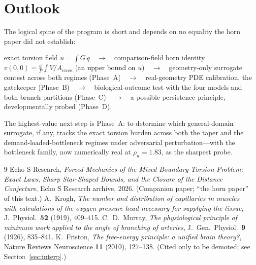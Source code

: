 \documentclass[11pt]{article}
\theoremstyle{remark}
\newcommand{\Acr}{A_{\mathrm{cross}}}
\newcommand{\rhou}{\rho_u}
\begin{document}
\section{Outlook}\label{sec:outlook}

The logical spine of the program is short and depends on no equality the horn
paper did not establish:
\begin{center}
exact torsion field $u=\int G\,q$\ \ $\to$\ \ comparison-field horn identity
$v(0,0)=\tfrac{q}{P}\int V/\Acr$ (an upper bound on $u$)\ \ $\to$\ \ geometry-only
surrogate contest across both regimes (Phase~A)\ \ $\to$\ \ real-geometry PDE
calibration, the gatekeeper (Phase~B)\ \ $\to$\ \ biological-outcome test with the
four models and both branch partitions (Phase~C)\ \ $\to$\ \ a possible
persistence principle, developmentally probed (Phase~D).
\end{center}
The highest-value next step is Phase~A: to determine which general-domain
surrogate, if any, tracks the exact torsion burden across both the taper and the
demand-loaded-bottleneck regimes under adversarial perturbation---with the
bottleneck family, now numerically real at $\rhou=1.83$, as the sharpest probe.

\begin{thebibliography}{9}
 Echo-S Research,
\emph{Forced Mechanics of the Mixed-Boundary Torsion Problem: Exact Laws, Sharp
Star-Shaped Bounds, and the Closure of the Distance Conjecture}, Echo S Research
archive, 2026. (Companion paper; ``the horn paper'' of this text.)
 A.~Krogh,
\emph{The number and distribution of capillaries in muscles with calculations of
the oxygen pressure head necessary for supplying the tissue}, J.~Physiol.\
\textbf{52} (1919), 409--415.
 C.~D.~Murray,
\emph{The physiological principle of minimum work applied to the angle of
branching of arteries}, J.~Gen.~Physiol.\ \textbf{9} (1926), 835--841.
\bibitem{friston2010} K.~Friston,
\emph{The free-energy principle: a unified brain theory?}, Nature Reviews
Neuroscience \textbf{11} (2010), 127--138. (Cited only to be demoted; see
Section~\ref{sec:interp}.)
\end{thebibliography}
\end{document}
